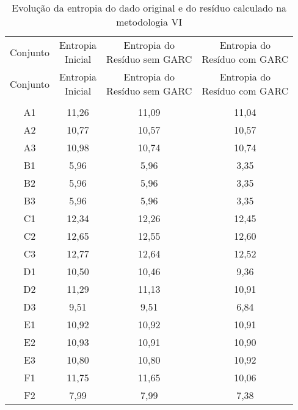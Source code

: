 \begin{center}
\begin{longtable}{cccc}
\toprule
\rowcolor{white}
\caption[Metodologia VI: evolução da entropia]{Evolução da entropia do dado
original e do resíduo calculado na metodologia VI}
\label{tab:EvolucaoEntropiaMet6}\\
\midrule
Conjunto & \specialcell{Entropia \\Inicial} & \specialcell{Entropia do
\\Resíduo sem GARC} & \specialcell{Entropia do
\\Resíduo com GARC}  \\
\midrule
\endfirsthead
\midrule
\rowcolor{white}
Conjunto & \specialcell{Entropia \\Inicial} & \specialcell{Entropia do
\\Resíduo sem GARC} & \specialcell{Entropia do
\\Resíduo com GARC}  \\
\toprule
\endhead
\midrule \\ %
\endfoot
\bottomrule 
\endlastfoot
    A1    & 11,26 & 11,09 & 11,04 \\
    A2    & 10,77 & 10,57 & 10,57 \\
    A3    & 10,98 & 10,74 & 10,74 \\
    B1    & 5,96  & 5,96  & 3,35 \\
    B2    & 5,96  & 5,96  & 3,35 \\
    B3    & 5,96  & 5,96  & 3,35 \\
    C1    & 12,34 & 12,26 & 12,45 \\
    C2    & 12,65 & 12,55 & 12,60 \\
    C3    & 12,77 & 12,64 & 12,52 \\
    D1    & 10,50 & 10,46 & 9,36 \\
    D2    & 11,29 & 11,13 & 10,91 \\
    D3    & 9,51  & 9,51  & 6,84 \\
    E1    & 10,92 & 10,92 & 10,91 \\
    E2    & 10,93 & 10,91 & 10,90 \\
    E3    & 10,80 & 10,80 & 10,92 \\
    F1    & 11,75 & 11,65 & 10,06 \\
    F2    & 7,99  & 7,99  & 7,38 \\

\end{longtable}
\end{center}
